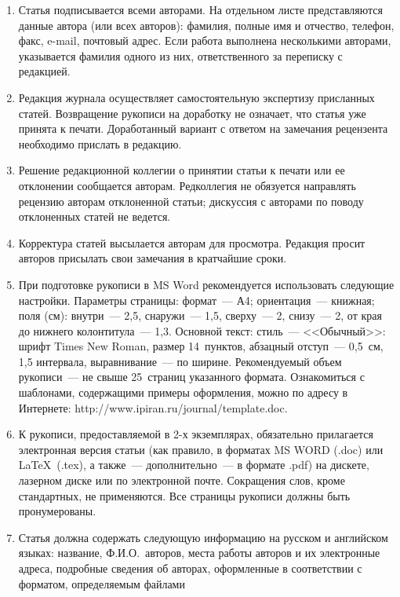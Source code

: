 {{\begin{enumerate}
Указанное соглашение может быть представлено как в бумажном виде, так и в виде 
отсканированной копии (с подписями авторов).

Редколлегия вправе запросить у авторов экспертное заключение о возможности
опубликования представленной статьи в открытой печати.
\item Статья
подписывается всеми авторами. На отдельном листе представляются данные автора
(или всех авторов): фамилия, полные имя и отчество, телефон, факс, e-mail,
почтовый адрес. Если работа выполнена несколькими авторами, указывается фамилия
одного из них, ответственного за переписку с редакцией.
\item Редакция журнала
осуществляет самостоятельную экспертизу присланных статей. Возвращение рукописи
на доработку не означает, что статья уже принята к печати. Доработанный вариант
с ответом на замечания рецензента необходимо прислать в редакцию.
\item Решение
редакционной коллегии о принятии статьи к печати или ее отклонении сообщается
авторам. Редколлегия не обязуется направлять рецензию авторам отклоненной
статьи; дискуссия с авторами по поводу отклоненных статей не ведется.
\item Корректура статей высылается авторам для просмотра. Редакция
просит авторов присылать свои замечания в кратчайшие сроки.
\item При
подготовке рукописи в MS Word рекомендуется использовать следующие настройки.
Параметры страницы: формат~--- А4; ориентация~--- книжная; поля (см): внутри~---
2,5, снаружи~--- 1,5, сверху~--- 2, снизу~--- 2, от края до нижнего
колонтитула~--- 1,3. Основной текст: стиль~--- <<Обычный>>: шрифт Times New
Roman, размер 14~пунктов, абзацный отступ~--- 0,5~см, 1,5 интервала,
выравнивание~--- по ширине. Рекомендуемый объем рукописи~--- не свыше
25~страниц указанного формата. Ознакомиться с шаблонами, содержащими примеры
оформления, можно по адресу в Интернете:
\textsf{http://www.ipiran.ru/journal/template.doc}.
\item К рукописи, предоставляемой в 2-х
экземплярах, обязательно прилагается электронная версия статьи (как правило, в
форматах MS WORD (.doc) или \LaTeX\  (.tex), а также~--- дополнительно~--- в
формате .pdf) на дискете, лазерном диске или по электронной почте. Сокращения
слов, кроме стандартных, не применяются. Все страницы рукописи должны быть
пронумерованы.
\item Статья должна содержать следующую информацию на русском и
английском языках: название, Ф.И.О.\ авторов, места работы авторов и их
электронные адреса,
подробные сведения об авторах, оформленные в соответствии с форматом, определяемым файлами


\end{enumerate}}}

